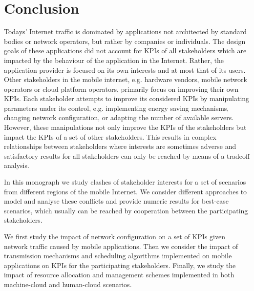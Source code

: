 \chapter{Conclusion}\label{chap:conclusion}

Todays' Internet traffic is dominated by applications not architected by standard bodies or network operators, but rather by companies or individuals.
The design goals of these applications did not account for \glspl{KPI} of all stakeholders which are impacted by the behaviour of the application in the Internet.
Rather, the application provider is focused on its own interests and at most that of its users.
Other stakeholders in the mobile internet, e.g. hardware vendors, mobile network operators or cloud platform operators, primarily focus on improving their own \glspl{KPI}.
Each stakeholder attempts to improve its considered \glspl{KPI} by manipulating parameters under its control, e.g. implementing energy saving mechanisms, changing network configuration, or adapting the number of available servers.
However, these manipulations not only improve the \glspl{KPI} of the stakeholders but impact the \glspl{KPI} of a set of other stakeholders.
This results in complex relationships between stakeholders where interests are sometimes adverse and satisfactory results for all stakeholders can only be reached by means of a tradeoff analysis.

In this monograph we study clashes of stakeholder interests for a set of scenarios from different regions of the mobile Internet.
We consider different approaches to model and analyse these conflicts and provide numeric results for best-case scenarios, which usually can be reached by cooperation between the participating stakeholders.

We first study the impact of network configuration on a set of \glspl{KPI} given network traffic caused by mobile applications.
Then we consider the impact of transmission mechanisms and scheduling algorithms implemented on mobile applications on \glspl{KPI} for the participating stakeholders.
Finally, we study the impact of resource allocation and management schemes implemented in both machine-cloud and human-cloud scenarios.

